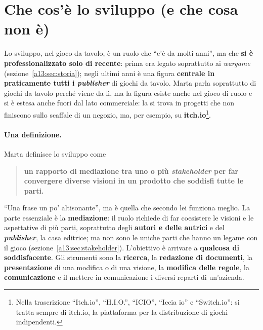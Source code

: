 \section{Che cos'è lo sviluppo (e che cosa non è)}
\label{a13:sec:cose}



Lo sviluppo, nel gioco da tavolo, è un ruolo che ``c'è da molti anni'', ma che \textbf{si
è professionalizzato solo di recente}: prima era legato soprattutto ai \emph{wargame}
(sezione~\ref{a13:sec:storia}); negli ultimi anni è una figura \textbf{centrale in
praticamente tutti i \emph{publisher}} di giochi da tavolo. Marta parla soprattutto di
giochi da tavolo perché viene da lì, ma la figura esiste anche nel gioco di ruolo e si
è estesa anche fuori dal lato commerciale: la si trova in progetti che non finiscono
sullo scaffale di un negozio, ma, per esempio, su \textbf{itch.io}\footnote{Nella
trascrizione ``Itch.io'', ``H.I.O.'', ``ICIO'', ``Iccia io'' e ``Switch.io'': si tratta
sempre di itch.io, la piattaforma per la distribuzione di giochi indipendenti.}.

\paragraph{Una definizione.} Marta definisce lo sviluppo come
\begin{quote}
\textbf{un rapporto di mediazione tra uno o più \emph{stakeholder} per far convergere
diverse visioni in un prodotto che soddisfi tutte le parti.}
\end{quote}
``Una frase un po' altisonante'', ma è quella che secondo lei funziona meglio. La parte
essenziale è la \textbf{mediazione}: il ruolo richiede di far coesistere le visioni e le
aspettative di più parti, soprattutto degli \textbf{autori e delle autrici} e del
\textbf{\emph{publisher}}, la casa editrice; ma non sono le uniche parti che hanno un
legame con il gioco (sezione~\ref{a13:sec:stakeholder}). L'obiettivo è arrivare a
\textbf{qualcosa di soddisfacente}. Gli strumenti sono la \textbf{ricerca}, la
\textbf{redazione di documenti}, la \textbf{presentazione} di una modifica o di una
visione, la \textbf{modifica delle regole}, la \textbf{comunicazione} e il mettere in
comunicazione i diversi reparti di un'azienda.

